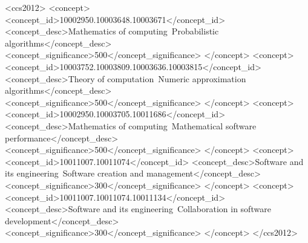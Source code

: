 \documentclass[acmtog, authorversion]{acmart}
\begin{document}
\begin{CCSXML}
<ccs2012>
<concept>
<concept_id>10002950.10003648.10003671</concept_id>
<concept_desc>Mathematics of computing~Probabilistic algorithms</concept_desc>
<concept_significance>500</concept_significance>
</concept>
<concept>
<concept_id>10003752.10003809.10003636.10003815</concept_id>
<concept_desc>Theory of computation~Numeric approximation algorithms</concept_desc>
<concept_significance>500</concept_significance>
</concept>
<concept>
<concept_id>10002950.10003705.10011686</concept_id>
<concept_desc>Mathematics of computing~Mathematical software performance</concept_desc>
<concept_significance>500</concept_significance>
</concept>
<concept>
<concept_id>10011007.10011074</concept_id>
<concept_desc>Software and its engineering~Software creation and management</concept_desc>
<concept_significance>300</concept_significance>
</concept>
<concept>
<concept_id>10011007.10011074.10011134</concept_id>
<concept_desc>Software and its engineering~Collaboration in software development</concept_desc>
<concept_significance>300</concept_significance>
</concept>
</ccs2012>
\end{CCSXML}

%
%







\maketitle
\end{document}
